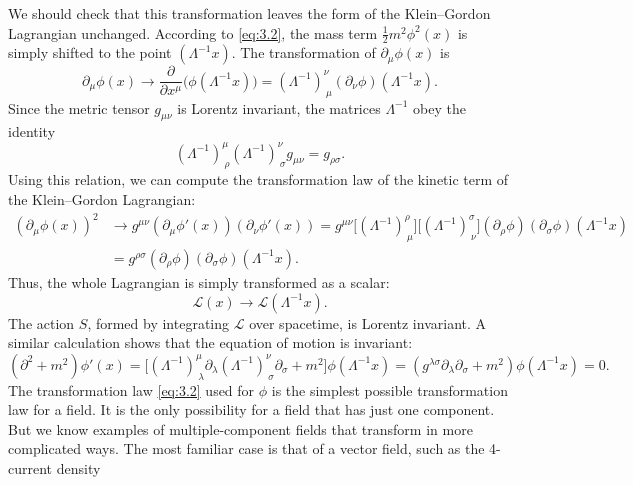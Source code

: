We should check that this transformation leaves the form of the
Klein--Gordon Lagrangian unchanged.  According to \eqref{eq:3.2}, the mass
term $\frac{1}{2}m^2\phi^2(x)$ is simply shifted to the point
$(\Lambda^{-1}x)$.  The transformation of $\partial_\mu\phi(x)$ is
\begin{equation}
  \partial_\mu\phi(x) \to
    \frac{\partial}{\partial x^\mu}\bigl(\phi(\Lambda^{-1}x)\bigr)
    = (\Lambda^{-1})^{\nu}_{\ \mu}(\partial_\nu\phi)(\Lambda^{-1}x).
  \label{eq:3.3}
\end{equation}
Since the metric tensor $g_{\mu\nu}$ is Lorentz invariant, the matrices
$\Lambda^{-1}$ obey the identity
\begin{equation}
  (\Lambda^{-1})^{\mu}_{\ \rho}(\Lambda^{-1})^{\nu}_{\ \sigma}
    g_{\mu\nu} = g_{\rho\sigma} .
  \label{eq:3.4}
\end{equation}
Using this relation, we can compute the transformation law of the kinetic
term of the Klein--Gordon Lagrangian:
\begin{align}
  (\partial_\mu\phi(x))^2 &\to
    g^{\mu\nu}(\partial_\mu\phi'(x))(\partial_\nu\phi'(x))
  = g^{\mu\nu}\bigl[(\Lambda^{-1})^{\rho}_{\ \mu}\bigr]
    \bigl[(\Lambda^{-1})^{\sigma}_{\ \nu}\bigr]
    (\partial_\rho\phi)(\partial_\sigma\phi)(\Lambda^{-1}x)\\
  &= g^{\rho\sigma}(\partial_\rho\phi)(\partial_\sigma\phi)(\Lambda^{-1}x).
\end{align}
Thus, the whole Lagrangian is simply transformed as a scalar:
\begin{equation}
  \mathcal{L}(x) \to \mathcal{L}(\Lambda^{-1}x).
  \label{eq:3.5}
\end{equation}
The action $S$, formed by integrating $\mathcal{L}$ over spacetime, is
Lorentz invariant.  A similar calculation shows that the equation of motion
is invariant:
\begin{equation}
  (\partial^2 + m^2)\phi'(x) = \bigl[
    (\Lambda^{-1})^{\mu}_{\ \lambda}\partial_\lambda
    (\Lambda^{-1})^{\nu}_{\ \sigma}\partial_\sigma + m^2 \bigr]
    \phi(\Lambda^{-1}x) = (g^{\lambda\sigma}\partial_\lambda\partial_\sigma
    + m^2)\phi(\Lambda^{-1}x) = 0 .
\end{equation}
The transformation law \eqref{eq:3.2} used for $\phi$ is the simplest
possible transformation law for a field.  It is the only possibility for a
field that has just one component.  But we know examples of
multiple-component fields that transform in more complicated ways.  The
most familiar case is that of a vector field, such as the 4-current density
